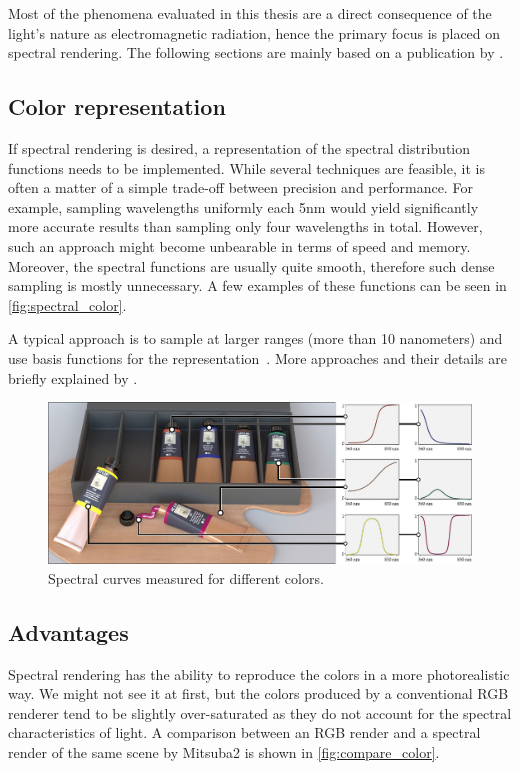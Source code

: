 Most of the phenomena evaluated in this thesis are a direct consequence of the light's nature as electromagnetic radiation, hence the primary focus is placed on spectral rendering.
The following sections are mainly based on a publication by \citet{wilkie2002tone}.

\subsection{Color representation}

If spectral rendering is desired, a representation of the spectral distribution functions needs to be implemented. While several techniques are feasible, it is often a matter of a simple trade-off between precision and performance. For example, sampling wavelengths uniformly each 5nm would yield significantly more accurate results than sampling only four wavelengths in total. However, such an approach might become unbearable in terms of speed and memory. Moreover, the spectral functions are usually quite smooth, therefore such dense sampling is mostly unnecessary. A few examples of these functions can be seen in \autoref{fig:spectral_color}.

A typical approach is to sample at larger ranges (more than 10 nanometers) and use basis functions for the representation~\cite{peercy1993linear}. More approaches and their details are briefly explained by \citet{wilkie2002tone}.

\begin{figure}[httpb]
	\centering
	\includegraphics[width=.9\linewidth]{img/spectral_color.jpg}
	\caption{Spectral curves measured for different colors\cite{jakob2019low}.}
	\label{fig:spectral_color}
\end{figure}

\subsection{Advantages}

Spectral rendering has the ability to reproduce the colors in a more photorealistic way. We might not see it at first, but the colors produced by a conventional RGB renderer tend to be slightly over-saturated as they do not account for the spectral characteristics of light. A comparison between an RGB render and a spectral render of the same scene by Mitsuba2 is shown in \autoref{fig:compare_color}.

